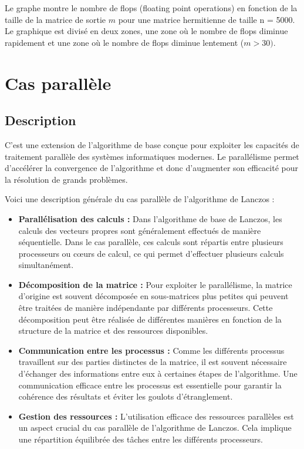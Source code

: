 \documentclass[11pt,french]{article}
\begin{document}
    Le graphe montre le nombre de flops (floating point operations) en fonction de la taille de la matrice de sortie $m$ pour une matrice hermitienne de taille n = 5000. Le graphique est divisé en deux zones, une zone où le nombre de flops diminue rapidement et une zone où le nombre de flops diminue lentement ($m>30)$.
    \FloatBarrier
    
	\newpage

	\section{Cas parallèle}
	
	\subsection{Description}
    C'est une extension de l'algorithme de base conçue pour exploiter les capacités de traitement parallèle des systèmes informatiques modernes. Le parallélisme permet d'accélérer la convergence de l'algorithme et donc d'augmenter son efficacité pour la résolution de grands problèmes.

    Voici une description générale du cas parallèle de l'algorithme de Lanczos :
    \begin{itemize}

    \item \textbf{Parallélisation des calculs :} Dans l'algorithme de base de Lanczos, les calculs des vecteurs propres sont généralement effectués de manière séquentielle. Dans le cas parallèle, ces calculs sont répartis entre plusieurs processeurs ou cœurs de calcul, ce qui permet d'effectuer plusieurs calculs simultanément.
    \item \textbf{Décomposition de la matrice :} Pour exploiter le parallélisme, la matrice d'origine est souvent décomposée en sous-matrices plus petites qui peuvent être traitées de manière indépendante par différents processeurs. Cette décomposition peut être réalisée de différentes manières en fonction de la structure de la matrice et des ressources disponibles.
    \item \textbf{Communication entre les processus :} Comme les différents processus travaillent sur des parties distinctes de la matrice, il est souvent nécessaire d'échanger des informations entre eux à certaines étapes de l'algorithme. Une communication efficace entre les processus est essentielle pour garantir la cohérence des résultats et éviter les goulots d'étranglement.
    \item \textbf{Gestion des ressources :} L'utilisation efficace des ressources parallèles est un aspect crucial du cas parallèle de l'algorithme de Lanczos. Cela implique une répartition équilibrée des tâches entre les différents processeurs.
	\end{itemize}
\end{document}
